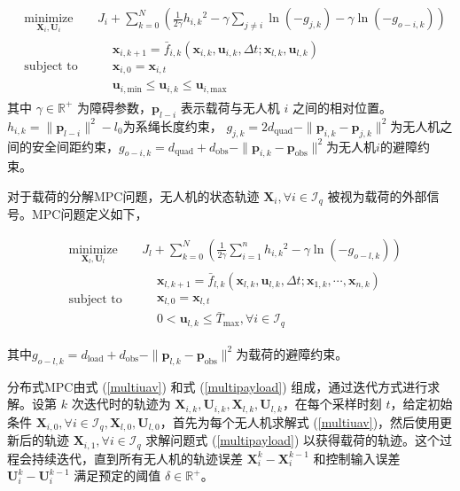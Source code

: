 \documentclass[lang=chs, degree=master, blindreview=false, winfonts=true]{yanputhesis}
\begin{document}
\begin{equation}
	\begin{aligned} 
	&\operatorname*{minimize}_{\bm{X}_i, \bm{U}_i} & & J_i + \sum_{k=0}^{N} \left( \frac{1}{2\gamma} h_{i,k}{}^2 - \gamma \sum_{j \neq i} \ln(-g_{j,k}) -\gamma \ln(-g_{{o-i},k}) \right)\\
	&\text{subject to}& & \begin{aligned}
& \bm{x}_{i,{k+1}} = \bar{f}_{i,k}(\bm{x}_{i,k}, \bm{u}_{i,k}, \Delta t; \bm{x}_{l,k}, \bm{u}_{l,k}) \\
& \bm{x}_{i,0} = \bm{x}_{i,t}\\
& \bm{u}_{i,{\text{min}}} \leq \bm{u}_{i,k} \leq \bm{u}_{i,{\text{max}}}		\end{aligned}	
\end{aligned}
\label{multiuav}
\end{equation}
其中
$\gamma \in \mathbb{R}^+$ 为障碍参数，$\bm p_{l-i}$ 表示载荷与无人机 $i$ 之间的相对位置。
$h_{i,k} = \|\bm p_{l-i}\|^2 - l_0$为系绳长度约束，
$g_{j,k} = 2d_{\text{quad}} - \|\bm p_{i,k} - \bm p_{j,k}\|^2$为无人机之间的安全间距约束，$g_{{o-i},k} = d_{\text{quad}} + d_{\text{obs}} - \|\bm p_{i,k} - \bm p_{\text{obs}}\|^2$为无人机$i$的避障约束。

对于载荷的分解MPC问题，无人机的状态轨迹 $\bm X_i, \forall i \in \mathcal{I}_q$ 被视为载荷的外部信号。MPC问题定义如下，

\begin{equation}
	\begin{aligned} 
	&\operatorname*{minimize}_{\bm{X}_l, \bm{U}_l}& &  J_l + \sum_{k=0}^{N} \left( \frac{1}{2\gamma} \sum_{i=1}^{n} h_{i,k}{}^2 - \gamma \ln(-g_{{o-l},k}) \right)\\
	&\text{subject to}& & \begin{aligned}
& \bm{x}_{l,{k+1}} = \bar{f}_{l,k}(\bm{x}_{l,k}, \bm{u}_{l,k}, \Delta t; \bm{x}_{1,k}, \cdots, \bm{x}_{n,k}) \\
& \bm{x}_{l,0} = \bm{x}_{l,t}\\
& 0 < \bm{u}_{l,k} \leq \bar{T}_{\text{max}}, \forall i \in \mathcal{I}_q		\end{aligned}	
\end{aligned}
\label{multipayload}
\end{equation}

其中$g_{{o-l},k} = d_{\text{load}} + d_{\text{obs}} - \| \bm p_{l,k} - \bm p_{\text{obs}}\|^2$为载荷的避障约束。



分布式MPC由式 (\ref{multiuav}) 和式 (\ref{multipayload}) 组成，通过迭代方式进行求解。设第 $k$ 次迭代时的轨迹为 $\bm X_{i,k}, \bm U_{i,k}, \bm X_{l,k}, \bm U_{l,k}$，在每个采样时刻 $t$，给定初始条件 $\bm X_{i,0}, \forall i \in \mathcal{I}_q, \bm X_{l,0}, \bm U_{l,0}$，首先为每个无人机求解式 (\ref{multiuav})，然后使用更新后的轨迹 $\bm X_{i,1}, \forall i \in \mathcal{I}_q$ 求解问题式 (\ref{multipayload}) 以获得载荷的轨迹。这个过程会持续迭代，直到所有无人机的轨迹误差 $\bm X_i^k - \bm X_i^{k-1}$ 和控制输入误差 $\bm U_i^k - \bm U_i^{k-1}$ 满足预定的阈值 $\delta \in \mathbb{R}^+$。
\end{document}
